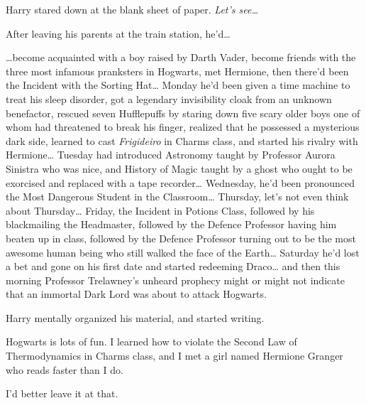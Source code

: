 Harry stared down at the blank sheet of paper. \emph{Let's see{\ldots}}

After leaving his parents at the train station, he'd{\ldots}

{\ldots}become acquainted with a boy raised by Darth Vader, become friends with
the three most infamous pranksters in Hogwarts, met Hermione, then there'd been
the Incident with the Sorting Hat{\ldots} Monday he'd been given a time machine
to treat his sleep disorder, got a legendary invisibility cloak from an
unknown benefactor, rescued seven Hufflepuffs by staring down five scary older
boys one of whom had threatened to break his finger, realized that he possessed
a mysterious dark side, learned to cast \emph{Frigideiro} in Charms class, and
started his rivalry with Hermione{\ldots} Tuesday had introduced
Astronomy taught by Professor Aurora Sinistra who was nice, and History of
Magic taught by a ghost who ought to be exorcised and replaced with a tape
recorder{\ldots} Wednesday, he'd been pronounced the Most Dangerous Student in
the Classroom{\ldots} Thursday, let's not even think about Thursday{\ldots}
Friday, the Incident in Potions Class, followed by his blackmailing the
Headmaster, followed by the Defence Professor having him beaten up in class,
followed by the Defence Professor turning out to be the most awesome human
being who still walked the face of the Earth{\ldots} Saturday he'd lost a bet
and gone on his first date and started redeeming Draco{\ldots} and then this
morning Professor Trelawney's unheard prophecy might or might not indicate that
an immortal Dark Lord was about to attack Hogwarts.

Harry mentally organized his material, and started writing.

\begin{writtenNote}

Hogwarts is lots of fun. I learned how to violate the Second Law of
Thermodynamics in Charms class, and I met a girl named Hermione Granger who
reads faster than I do.

I'd better leave it at that.

\end{writtenNote}
